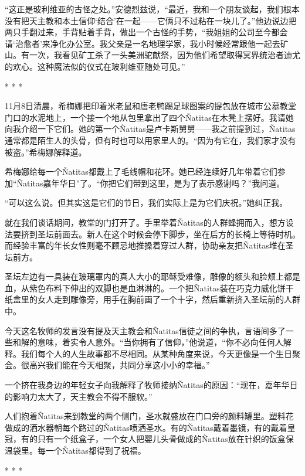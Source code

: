 \documentclass[12pt,oneside]{book}
\begin{document}
\begin{bookref}[frametitle={\cite{好好告别：世界葬礼观察手记}}]
“这正是玻利维亚的古怪之处。”安德烈兹说，“最近，我和一个朋友谈起，我们根本没有把天主教和本土信仰‘结合’在一起——它俩只不过粘在一块儿了。”他边说边把两只手翻过来，手背贴着手背，做出一个古怪的手势，“我姐姐的公司至今都会请‘治愈者’来净化办公室。我父亲是一名地理学家，我小时候经常跟他一起去矿山。有一次，我看见矿工杀了一头美洲驼献祭，因为他们希望取得冥界统治者迪尤的欢心。这种魔法似的仪式在玻利维亚随处可见。”

\begin{center}
* * *
\end{center}

11月8日清晨，希梅娜把印着米老鼠和唐老鸭踢足球图案的提包放在城市公墓教堂门口的水泥地上，一个接一个地从包里拿出了四个Ñatitas在木凳上摆好。我请她向我介绍一下它们。她的第一个Ñatitas是卢卡斯舅舅——我之前提到过，Ñatitas通常都是陌生人的头骨，但有时也可以用家里人的。“因为有它在，我们家才没有被盗。”希梅娜解释道。

希梅娜给每一个Ñatitas都戴上了毛线帽和花环。她已经连续好几年带着它们参加“Ñatitas嘉年华日”了。“你把它们带到这里，是为了表示感谢吗？”我问道。

“可以这么说。但其实这是它们的节日，我们实际上是为它们庆祝。”她纠正我。

就在我们谈话期间，教堂的门打开了。手里举着Ñatitas的人群蜂拥而入，想方设法要挤到圣坛前面去。新人在这个时候会停下脚步，坐在后方的长椅上等待时机。而经验丰富的年长女性则毫不顾忌地推搡着穿过人群，协助亲友把Ñatitas堆在圣坛前方。

圣坛左边有一具装在玻璃罩内的真人大小的耶稣受难像，雕像的额头和脸颊上都是血，从紫色布料下伸出的双脚也是血淋淋的。一个把Ñatitas装在巧克力威化饼干纸盒里的女人走到雕像旁，用手在胸前画了一个十字，然后重新挤入圣坛前的人群中。

今天这名牧师的发言没有提及天主教会和Ñatitas信徒之间的争执，言语间多了一些和解的意味，着实令人意外。“当你拥有了信仰，”他说道，“你不必向任何人解释。我们每个人的人生故事都不尽相同。从某种角度来说，今天更像是一个生日聚会。很高兴我们能在今天相聚，共同分享这小小的幸福。”

一个挤在我身边的年轻女子向我解释了牧师接纳Ñatitas的原因：“现在，嘉年华日的影响力太大了，天主教会不得不服软。”

人们抱着Ñatitas来到教堂的两个侧门，圣水就盛放在门口旁的颜料罐里。塑料花做成的洒水器朝每个路过的Ñatitas喷洒圣水。有的Ñatitas戴着墨镜，有的戴着皇冠，有的只有一个纸盒子，一个女人把婴儿头骨做成的Ñatitas放在针织的饭盒保温袋里。每一个Ñatitas都得到了祝福。

\begin{center}
* * *
\end{center}


\end{bookref}
\end{document}
